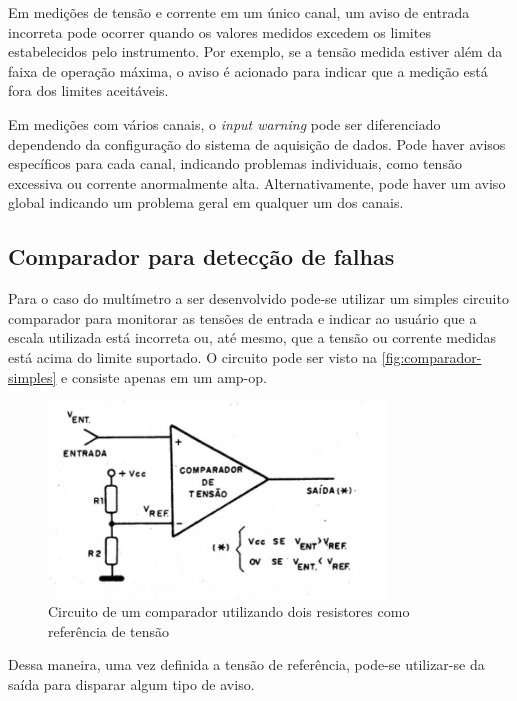 Em medições de tensão e corrente em um único canal, um aviso de entrada incorreta pode ocorrer quando os valores medidos excedem os limites estabelecidos pelo instrumento. Por exemplo, se a tensão medida estiver além da faixa de operação máxima, o aviso é acionado para indicar que a medição está fora dos limites aceitáveis.

Em medições com vários canais, o \textit{input warning} pode ser diferenciado dependendo da configuração do sistema de aquisição de dados. Pode haver avisos específicos para cada canal, indicando problemas individuais, como tensão excessiva ou corrente anormalmente alta. Alternativamente, pode haver um aviso global indicando um problema geral em qualquer um dos canais.

\subsection{Comparador para detecção de falhas} \label{subsec:compfalhas}

Para o caso do multímetro a ser desenvolvido pode-se utilizar um simples circuito comparador para monitorar as tensões de entrada e indicar ao usuário que a escala utilizada está incorreta ou, até mesmo, que a tensão ou corrente medidas está acima do limite suportado. O circuito pode ser visto na \autoref{fig:comparador-simples} e consiste apenas em um \gls{amp-op}.

\begin{figure}[htb!]
    \caption{Circuito de um comparador utilizando dois resistores como referência de tensão}
    \label{fig:comparador-simples}
    \includegraphics[width=0.8\textwidth]{figuras/ampop-comparador.png}
\end{figure}

Dessa maneira, uma vez definida a tensão de referência, pode-se utilizar-se da saída para disparar algum tipo de aviso.

